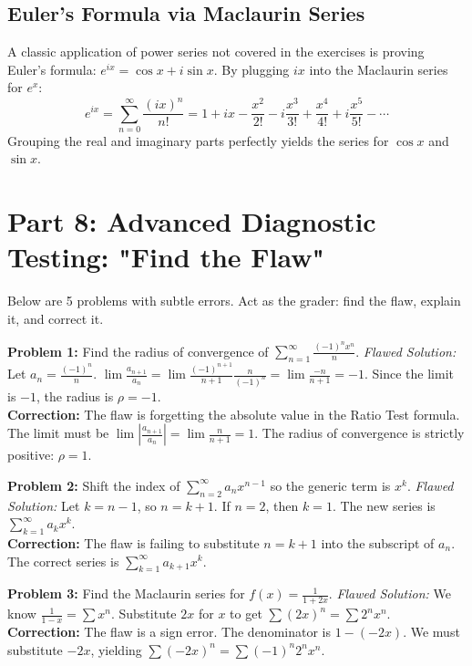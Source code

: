 \documentclass[11pt, letterpaper]{article}
\theoremstyle{definition}
\theoremstyle{remark}
\begin{document}
\subsection{Euler's Formula via Maclaurin Series}
A classic application of power series not covered in the exercises is proving Euler's formula: $e^{ix} = \cos x + i \sin x$.
By plugging $ix$ into the Maclaurin series for $e^x$:
\[ e^{ix} = \sum_{n=0}^{\infty} \frac{(ix)^n}{n!} = 1 + ix - \frac{x^2}{2!} - i\frac{x^3}{3!} + \frac{x^4}{4!} + i\frac{x^5}{5!} - \cdots \]
Grouping the real and imaginary parts perfectly yields the series for $\cos x$ and $\sin x$.

\section{Part 8: Advanced Diagnostic Testing: "Find the Flaw"}

Below are 5 problems with subtle errors. Act as the grader: find the flaw, explain it, and correct it.

\textbf{Problem 1:} Find the radius of convergence of $\sum_{n=1}^{\infty} \frac{(-1)^n x^n}{n}$.
\textit{Flawed Solution:} Let $a_n = \frac{(-1)^n}{n}$. $\lim \frac{a_{n+1}}{a_n} = \lim \frac{(-1)^{n+1}}{n+1} \frac{n}{(-1)^n} = \lim \frac{-n}{n+1} = -1$. Since the limit is $-1$, the radius is $\rho = -1$.
\\[6pt]
\textbf{Correction:} The flaw is forgetting the absolute value in the Ratio Test formula. The limit must be $\lim \left| \frac{a_{n+1}}{a_n} \right| = \lim \frac{n}{n+1} = 1$. The radius of convergence is strictly positive: $\rho = 1$.

\textbf{Problem 2:} Shift the index of $\sum_{n=2}^{\infty} a_n x^{n-1}$ so the generic term is $x^k$.
\textit{Flawed Solution:} Let $k = n-1$, so $n = k+1$. If $n=2$, then $k=1$. The new series is $\sum_{k=1}^{\infty} a_k x^k$.
\\[6pt]
\textbf{Correction:} The flaw is failing to substitute $n = k+1$ into the subscript of $a_n$. The correct series is $\sum_{k=1}^{\infty} a_{k+1} x^k$.

\textbf{Problem 3:} Find the Maclaurin series for $f(x) = \frac{1}{1+2x}$.
\textit{Flawed Solution:} We know $\frac{1}{1-x} = \sum x^n$. Substitute $2x$ for $x$ to get $\sum (2x)^n = \sum 2^n x^n$.
\\[6pt]
\textbf{Correction:} The flaw is a sign error. The denominator is $1 - (-2x)$. We must substitute $-2x$, yielding $\sum (-2x)^n = \sum (-1)^n 2^n x^n$.
\end{document}
